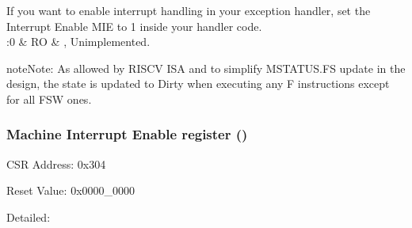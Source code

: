 \documentclass[letterpaper,10pt,english]{sphinxmanual}
\begin{document}
\begin{savenotes}
\begin{tabular}[t]{}
\sphinxAtStartPar
If you want to enable interrupt handling in your exception handler,
set the Interrupt Enable MIE to 1 inside your handler code.
\\
\sphinxhline
{}:0
&
\sphinxAtStartPar
RO
&
, Unimplemented.
\\
\sphinxbottomrule
\end{tabular}
\sphinxtableafterendhook\par
\sphinxattableend\end{savenotes}

\begin{sphinxadmonition}{note}{Note:}
\sphinxAtStartPar
As allowed by RISC\sphinxhyphen{}V ISA and to simplify MSTATUS.FS update in the design, the state is updated to Dirty when executing any F instructions except for all FSW ones.
\end{sphinxadmonition}


\subsubsection{Machine Interrupt Enable register ()}
\label{\detokenize{control_status_registers:machine-interrupt-enable-register-mie}}
\sphinxAtStartPar
CSR Address: 0x304

\sphinxAtStartPar
Reset Value: 0x0000\_0000

\sphinxAtStartPar
Detailed:
\end{document}
